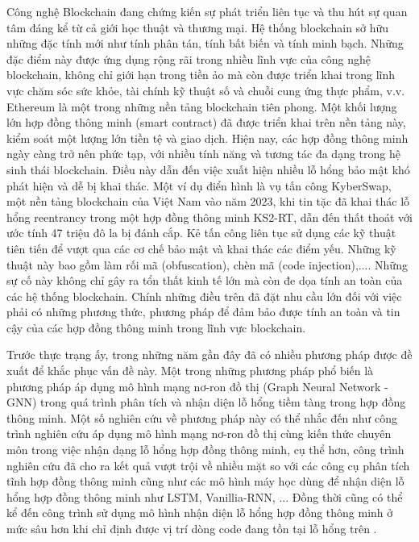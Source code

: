 \documentclass[letterpaper]{article}
\begin{document}
\indent \indent Công nghệ Blockchain đang chứng kiến sự phát triển liên tục và thu hút sự quan tâm đáng kể từ cả giới học thuật và thương mại. Hệ thống blockchain sở hữu những đặc tính mới như tính phân tán, tính bất biến và tính minh bạch. Những đặc điểm này được ứng dụng rộng rãi trong nhiều lĩnh vực của công nghệ blockchain, không chỉ giới hạn trong tiền ảo mà còn được triển khai trong lĩnh vực chăm sóc sức khỏe, tài chính kỹ thuật số và chuỗi cung ứng thực phẩm, v.v. Ethereum là một trong những nền tảng blockchain tiên phong. Một khối lượng lớn hợp đồng thông minh (smart contract) đã được triển khai trên nền tảng này, kiểm soát một lượng lớn tiền tệ và giao dịch. Hiện nay, các hợp đồng thông minh ngày càng trở nên phức tạp, với nhiều tính năng và tương tác đa dạng trong hệ sinh thái blockchain. Điều này dẫn đến việc xuất hiện nhiều lỗ hổng bảo mật khó phát hiện và dễ bị khai thác. Một ví dụ điển hình là vụ tấn công KyberSwap, một nền tảng blockchain của Việt Nam vào năm 2023, khi tin tặc đã khai thác lỗ hổng reentrancy trong một hợp đồng thông minh KS2-RT, dẫn đến thất thoát với ước tính 47 triệu đô la bị đánh cắp. Kẻ tấn công liên tục sử dụng các kỹ thuật tiên tiến để vượt qua các cơ chế bảo mật và khai thác các điểm yếu. Những kỹ thuật này bao gồm làm rối mã (obfuscation), chèn mã (code injection),...\cite{zhang2023bian}. Những sự cố này không chỉ gây ra tổn thất kinh tế lớn mà còn đe dọa tính an toàn của các hệ thống blockchain. Chính những điều trên đã đặt nhu cầu lớn đối với việc phải có những phương thức, phương pháp để đảm bảo được tính an toàn và tin cậy của các hợp đồng thông minh trong lĩnh vực blockchain.

\indent Trước thực trạng ấy, trong những năm gần đây đã có nhiều phương pháp được đề xuất để khắc phục vấn đề này. Một trong những phương pháp phổ biến là phương pháp áp dụng mô hình mạng nơ-ron đồ thị (Graph Neural Network - GNN) trong quá trình phân tích và nhận diện lỗ hổng tiềm tàng trong hợp đồng thông minh. Một số nghiên cứu về phương pháp này có thể nhắc đến như công trình nghiên cứu \cite{liu2021combining} áp dụng mô hình mạng nơ-ron đồ thị cùng kiến thức chuyên môn trong việc nhận dạng lỗ hổng hợp đồng thông minh, cụ thể hơn, công trình nghiên cứu đã cho ra kết quả vượt trội về nhiều mặt so với các công cụ phân tích tĩnh hợp đồng thông minh cũng như các mô hình máy học dùng để nhận diện lỗ hổng hợp đồng thông minh như LSTM, Vanillia-RNN, ... Đồng thời cũng có thể kể đến công trình sử dụng mô hình nhận diện lỗ hổng hợp đồng thông minh ở mức sâu hơn khi chỉ định được vị trí dòng code đang tồn tại lỗ hổng trên \cite{sendner2023g}.
\end{document}
